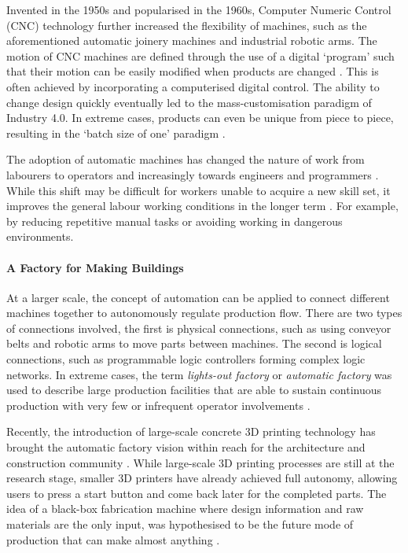 Invented in the 1950s and popularised in the 1960s, Computer Numeric Control (CNC) technology further increased the flexibility of machines, such as the aforementioned automatic joinery machines and industrial robotic arms. The motion of CNC machines are defined through the use of a digital ‘program’ such that their motion can be easily modified when products are changed \parencite{wardAutomaticProgrammingNumerically1959}. This is often achieved by incorporating a computerised digital control. The ability to change design quickly eventually led to the mass-customisation paradigm of Industry 4.0. In extreme cases, products can even be unique from piece to piece, resulting in the ‘batch size of one’ paradigm \parencite{wardAutomaticProgrammingNumerically1959}.

The adoption of automatic machines has changed the nature of work from labourers to operators and increasingly towards engineers and programmers \parencite{nobleForcesProductionSocial1986}. While this shift may be difficult for workers unable to acquire a new skill set, it improves the general labour working conditions in the longer term \parencite{stromquistWorldDevelopmentReport2019}. For example, by reducing repetitive manual tasks or avoiding working in dangerous environments. 

\paragraph{A Factory for Making Buildings}

\label{subsubsection:introduction-a-factory-for-making-buildings}

At a larger scale, the concept of automation can be applied to connect different machines together to autonomously regulate production flow. There are two types of connections involved, the first is physical connections, such as using conveyor belts and robotic arms to move parts between machines. The second is logical connections, such as programmable logic controllers forming complex logic networks. In extreme cases, the term \textit{lights-out factory} or \textit{automatic factory} was used to describe large production facilities that are able to sustain continuous production with very few or infrequent operator involvements \parencite{nobleForcesProductionSocial1986,walkerAutomaticFactoryCase1957}. 

Recently, the introduction of large-scale concrete 3D printing technology has brought the automatic factory vision within reach for the architecture and construction community \parencite{ngoAdditiveManufacturing3D2018}. While large-scale 3D printing processes are still at the research stage, smaller 3D printers have already achieved full autonomy, allowing users to press a start button and come back later for the completed parts. The idea of a black-box fabrication machine where design information and raw materials are the only input, was hypothesised to be the future mode of production that can make almost anything \parencite{gershenfeldHowMakeAlmost2012, gershenfeldInternetThings2004}.  

